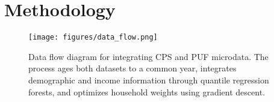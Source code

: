 \section{Methodology}\label{sec:methodology}

\begin{figure}[h]
    \centering
    \texttt{[image: figures/data\_flow.png]}
    \caption{Data flow diagram for integrating CPS and PUF microdata. The process ages both datasets to a common year, integrates demographic and income information through quantile regression forests, and optimizes household weights using gradient descent.}
    \label{fig:data_flow}
\end{figure}


  





